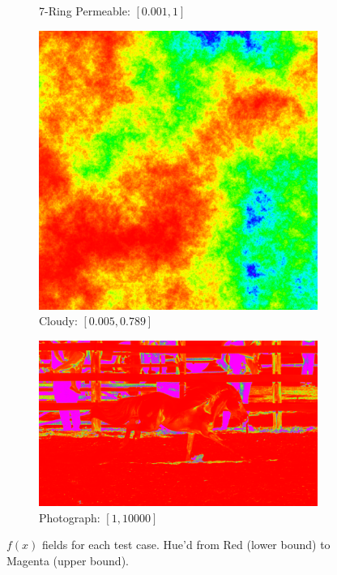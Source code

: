 \documentclass[11pt]{article}       %
\begin{document}
\begin{figure}
\begin{subfigure}[b]{.4\columnwidth}
		\caption{7-Ring Permeable: $[0.001, 1]$}
	\end{subfigure}
	\begin{subfigure}[b]{.4\columnwidth}
		\includegraphics[width=\textwidth]{Figures/speed_cloudy_s}
		\caption{Cloudy: $[0.005, 0.789]$}
	\end{subfigure}
	\begin{subfigure}[b]{.4\columnwidth}
		\includegraphics[width=\textwidth]{Figures/speed_photograph_s}
		\caption{Photograph: $[1, 10000]$}
	\end{subfigure}
	\caption{$f(x)$ fields for each test case. Hue'd from Red (lower bound) to Magenta (upper bound).}
	\label{fig:speed_field}
\end{figure}
\end{document}
